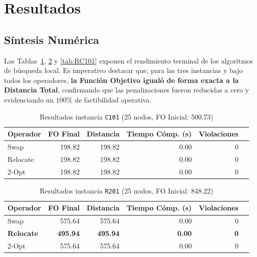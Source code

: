 \documentclass[letter, 10pt]{article}
\begin{document}
\section{Resultados}

\subsection{S\'intesis Num\'erica}

Las Tablas~\ref{tab:C101}, \ref{tab:R201} y \ref{tab:RC101} exponen el rendimiento terminal de los algoritmos de b\'usqueda local. Es imperativo destacar que, para las tres instancias y bajo todos los operadores, \textbf{la Funci\'on Objetivo igual\'o de forma exacta a la Distancia Total}, confirmando que las penalizaciones fueron reducidas a cero y evidenciando un $100\%$ de factibilidad operativa.

\begin{table}[h!]
\centering
\caption{Resultados instancia \texttt{C101} (25 nodos, FO Inicial: 500.73)}
\label{tab:C101}
\begin{tabular}{lrrrrc}
\toprule
\textbf{Operador} & \textbf{FO Final} & \textbf{Distancia} & \textbf{Tiempo C\'omp. (s)} & \textbf{Violaciones} \\
\midrule
Swap & 198.82 & 198.82 & 0.00 & 0 \\
Relocate & 198.82 & 198.82 & 0.00 & 0 \\
2-Opt & 198.82 & 198.82 & 0.00 & 0 \\
\bottomrule
\end{tabular}
\end{table}

\begin{table}[h!]
\centering
\caption{Resultados instancia \texttt{R201} (25 nodos, FO Inicial: 848.22)}
\label{tab:R201}
\begin{tabular}{lrrrrc}
\toprule
\textbf{Operador} & \textbf{FO Final} & \textbf{Distancia} & \textbf{Tiempo C\'omp. (s)} & \textbf{Violaciones} \\
\midrule
Swap & 575.64 & 575.64 & 0.00 & 0 \\
\textbf{Relocate}& \textbf{495.94} & \textbf{495.94} & \textbf{0.00} & \textbf{0} \\
2-Opt & 575.64 & 575.64 & 0.00 & 0 \\
\bottomrule
\end{tabular}
\end{table}
\end{document}
